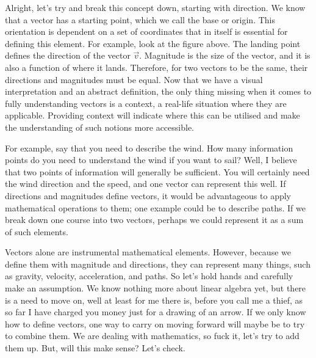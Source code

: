 \documentclass[600paper, 11pt,twoside,openany]{kdp}
\begin{document}
\indent Alright, let’s try and break this concept down, starting with direction. We know that a vector has a starting point, which we call the base or origin. This orientation is dependent on a set of coordinates that in itself is essential for defining this element. For example, look at the figure above. The landing point defines the direction of the vector $\overrightarrow{v}$. Magnitude is the size of the vector, and it is also a function of where it lands. Therefore, for two vectors to be the same, their directions and magnitudes must be equal. Now that we have a visual interpretation and an abstract definition, the only thing missing when it comes to fully understanding vectors is a context, a real-life situation where they are applicable. Providing context will indicate where this can be utilised and make the understanding of such notions more accessible. 
\par 
\vspace{-3pt}
\indent For example, say that you need to describe the wind. How many information points do you need to understand the wind if you want to sail? Well, I believe that two points of information will generally be sufficient. You will certainly need the wind direction and the speed, and one vector can represent this well. If directions and magnitudes define vectors, it would be advantageous to apply mathematical operations to them; one example could be to describe paths. If we break down one course into two vectors, perhaps we could represent it as a sum of such elements.
\par 
\vspace{-3pt}
\indent Vectors alone are instrumental mathematical elements. However, because we define them with magnitude and directions, they can represent many things, such as gravity, velocity, acceleration, and paths. So let’s hold hands and carefully make an assumption. We know nothing more about linear algebra yet, but there is a need to move on, well at least for me there is, before you call me a thief, as so far I have charged you money just for a drawing of an arrow. If we only know how to define vectors, one way to carry on moving forward will maybe be to try to combine them. We are dealing with mathematics, so fuck it, let’s try to add them up. But, will this make sense? Let’s check.
\newpage
\end{document}
